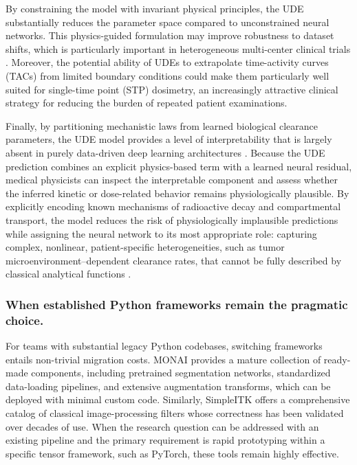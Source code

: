 \documentclass[a4paper,10pt,preprint]{elsarticle}
\begin{document}
By constraining the model with invariant physical principles, the UDE substantially reduces the parameter space compared to unconstrained neural networks. This physics-guided formulation may improve robustness to dataset shifts, which is particularly important in heterogeneous multi-center clinical trials \cite{XueGafita2024}. Moreover, the potential ability of UDEs to extrapolate time-activity curves (TACs) from limited boundary conditions could make them particularly well suited for single-time point (STP) dosimetry, an increasingly attractive clinical strategy for reducing the burden of repeated patient examinations.

Finally, by partitioning mechanistic laws from learned biological clearance parameters, the UDE model provides a level of interpretability that is largely absent in purely data-driven deep learning architectures \cite{AkhavanallafShiri2020}. Because the UDE prediction combines an explicit physics-based term with a learned neural residual, medical physicists can inspect the interpretable component and assess whether the inferred kinetic or dose-related behavior remains physiologically plausible. By explicitly encoding known mechanisms of radioactive decay and compartmental transport, the model reduces the risk of physiologically implausible predictions while assigning the neural network to its most appropriate role: capturing complex, nonlinear, patient-specific heterogeneities, such as tumor microenvironment–dependent clearance rates, that cannot be fully described by classical analytical functions \cite{AkhavanallafShiri2020}.

\subsubsection{When established Python frameworks remain the pragmatic choice.}
For teams with substantial legacy Python codebases, switching frameworks entails non-trivial migration costs. MONAI provides a mature collection of ready-made components, including pretrained segmentation networks, standardized data-loading pipelines, and extensive augmentation transforms, which can be deployed with minimal custom code. Similarly, SimpleITK offers a comprehensive catalog of classical image-processing filters whose correctness has been validated over decades of use. When the research question can be addressed with an existing pipeline and the primary requirement is rapid prototyping within a specific tensor framework, such as PyTorch, these tools remain highly effective.
\end{document}
